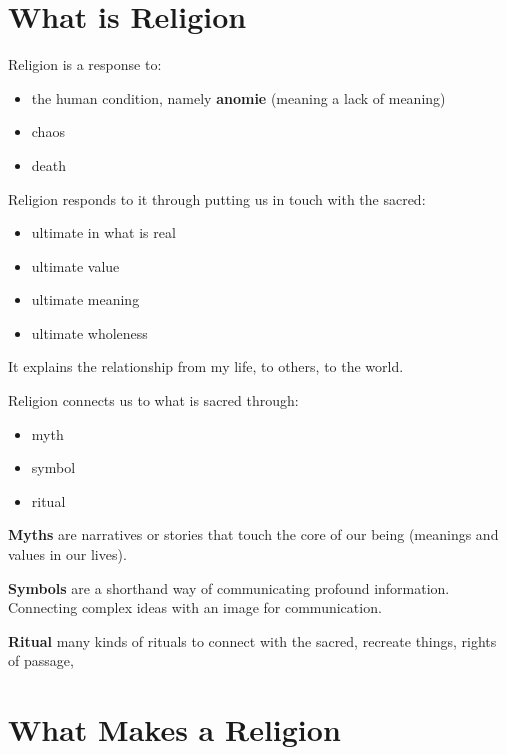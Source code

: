 \documentclass{article}
\begin{document}
\section*{What is Religion}
\label{sec:what_is_religion}

Religion is a response to:
\begin{itemize}
	\item the human condition, namely \textbf{anomie} (meaning a lack of meaning)
	\item chaos
	\item death 
\end{itemize}

Religion responds to it through putting us in touch with the sacred:
\begin{itemize}
	\item ultimate in what is real
	\item ultimate value
	\item ultimate meaning
	\item ultimate wholeness
\end{itemize}

It explains the relationship from my life, to others, to the world.

Religion connects us to what is sacred through:
\begin{itemize}
	\item myth
	\item symbol
	\item ritual
\end{itemize}

\textbf{Myths} are narratives or stories that touch the core of our being (meanings and values in our lives).

\textbf{Symbols} are a shorthand way of communicating profound information. Connecting complex ideas with an image for communication. 

\textbf{Ritual} many kinds of rituals to connect with the sacred, recreate things, rights of passage, 


\section*{What Makes a Religion}
\label{sec:what_makes_a_religion}
\end{document}
